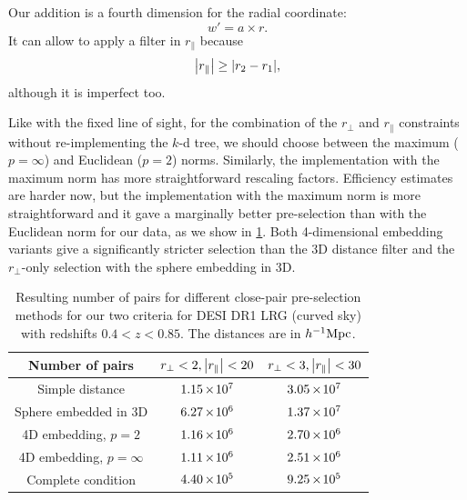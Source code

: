 Our addition is a fourth dimension for the radial coordinate:
\begin{equation}
    w' = a \times r.
\end{equation}
It can allow to apply a filter in $r_\parallel$ because
\begin{equation}
    \abs{r_\parallel} \ge \abs{r_2 - r_1},
\end{equation}
although it is imperfect too.

Like with the fixed line of sight, for the combination of the $r_\perp$ and $r_\parallel$ constraints without re-implementing the $k$-d tree, we should choose between the maximum ($p=\infty$) and Euclidean ($p=2$) norms.
Similarly, the implementation with the maximum norm has more straightforward rescaling factors.
Efficiency estimates are harder now, but the implementation with the maximum norm is more straightforward and it gave a marginally better pre-selection than with the Euclidean norm for our data, as we show in \cref{tab:close-pair-selection-methods-comparison}.
Both 4-dimensional embedding variants give a significantly stricter selection than the 3D distance filter and the $r_\perp$-only selection with the sphere embedding in 3D.

\begin{table}
    \centering
    \begin{tabular}{|c|c|c|}
        \hline
        Number of pairs & $r_\perp<2, \abs{r_\parallel}<20$ & $r_\perp<3, \abs{r_\parallel}<30$ \\
        \hline
        Simple distance & $1.15\E{7}$ & $3.05\E{7}$ \\
        Sphere embedded in 3D & $6.27\E{6}$ & $1.37\E{7}$ \\
        4D embedding, $p=2$ & $1.16\E{6}$ & $2.70\E{6}$ \\
        4D embedding, $p=\infty$ & $1.11\E{6}$ & $2.51\E{6}$ \\
        \hline
        Complete condition & $4.40\E{5}$ & $9.25\E{5}$ \\
        \hline
    \end{tabular}
    \caption[Comparison of different pair pre-selection methods' efficiency]{Resulting number of pairs for different close-pair pre-selection methods for our two criteria for DESI DR1 LRG (curved sky) with redshifts $0.4<z<0.85$.
    The distances are in $h^{-1}{\rm Mpc}$.}
    \label{tab:close-pair-selection-methods-comparison}
\end{table}